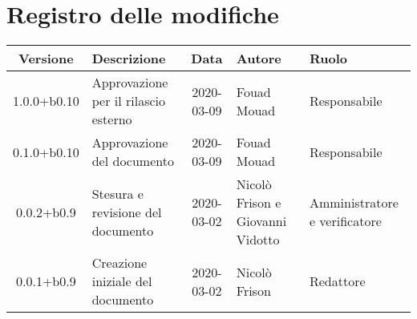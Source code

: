 \section*{Registro delle modifiche}

\begin{center}
	\begin{longtable}{|c|p{3.5cm}|c|p{3cm}|p{3cm}|}
	\hline
	\rowcolor{lighter-grayer}
	\textbf{Versione} & \textbf{Descrizione} & \textbf{Data} & \textbf{Autore} & \textbf{Ruolo} \\
	\hline
	\endfirsthead

	1.0.0+b0.10 & Approvazione per il rilascio esterno & 2020-03-09 & Fouad Mouad & Responsabile \\
	\hline
	0.1.0+b0.10 & Approvazione del documento & 2020-03-09 & Fouad Mouad & Responsabile \\
	\hline
	0.0.2+b0.9 & Stesura e revisione del documento & 2020-03-02 & Nicolò Frison e Giovanni Vidotto & Amministratore e verificatore \\
	\hline
	0.0.1+b0.9 & Creazione iniziale del documento & 2020-03-02 & Nicolò Frison & Redattore \\
	\hline

	\end{longtable}
\end{center}